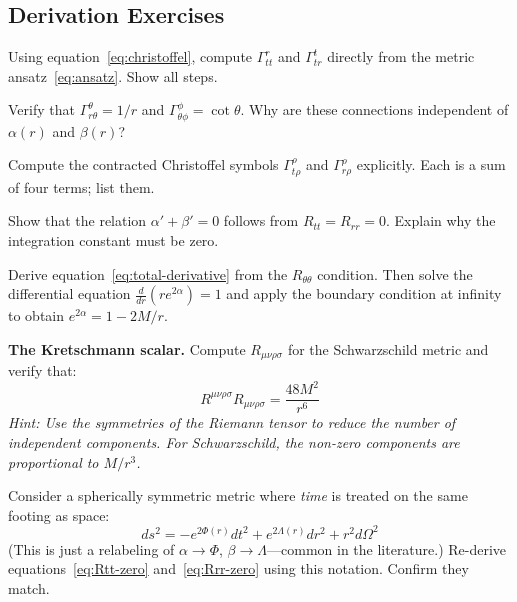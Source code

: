 \documentclass[12pt]{article}
\theoremstyle{definition}
\theoremstyle{remark}
\begin{document}
\subsection*{Derivation Exercises}

\begin{exbox}[label=ex:derive1]
  Using equation~\eqref{eq:christoffel}, compute $\Gamma^{r}_{tt}$ and $\Gamma^{t}_{tr}$
  directly from the metric ansatz~\eqref{eq:ansatz}. Show all steps.
\end{exbox}

\begin{exbox}[label=ex:derive2]
  Verify that $\Gamma^{\theta}_{r\theta} = 1/r$ and $\Gamma^{\phi}_{\theta\phi} = \cot\theta$.
  Why are these connections independent of $\alpha(r)$ and $\beta(r)$?
\end{exbox}

\begin{exbox}[label=ex:derive3]
  Compute the contracted Christoffel symbols $\Gamma^{\rho}_{t\rho}$ and $\Gamma^{\rho}_{r\rho}$
  explicitly. Each is a sum of four terms; list them.
\end{exbox}

\begin{exbox}[label=ex:derive4]
  Show that the relation $\alpha' + \beta' = 0$ follows from $R_{tt} = R_{rr} = 0$.
  Explain why the integration constant must be zero.
\end{exbox}

\begin{exbox}[label=ex:derive5]
  Derive equation~\eqref{eq:total-derivative} from the $R_{\theta\theta}$ condition.
  Then solve the differential equation $\frac{d}{dr}(re^{2\alpha}) = 1$ and apply
  the boundary condition at infinity to obtain $e^{2\alpha} = 1 - 2M/r$.
\end{exbox}

\begin{exbox}[label=ex:derive6]
  \textbf{The Kretschmann scalar.} Compute $R_{\mu\nu\rho\sigma}$ for the Schwarzschild
  metric and verify that:
  \begin{equation*}
    R^{\mu\nu\rho\sigma}R_{\mu\nu\rho\sigma} = \frac{48M^{2}}{r^{6}}
  \end{equation*}
  \textit{Hint: Use the symmetries of the Riemann tensor to reduce the number of
  independent components. For Schwarzschild, the non-zero components are proportional
  to $M/r^{3}$.}
\end{exbox}

\begin{exbox}[label=ex:derive7]
  Consider a spherically symmetric metric where \emph{time} is treated on the same
  footing as space:
  \begin{equation*}
    ds^{2} = -e^{2\Phi(r)}dt^{2} + e^{2\Lambda(r)}dr^{2} + r^{2}d\Omega^{2}
  \end{equation*}
  (This is just a relabeling of $\alpha \to \Phi$, $\beta \to \Lambda$---common in
  the literature.) Re-derive equations~\eqref{eq:Rtt-zero} and~\eqref{eq:Rrr-zero}
  using this notation. Confirm they match.
\end{exbox}
\end{document}
